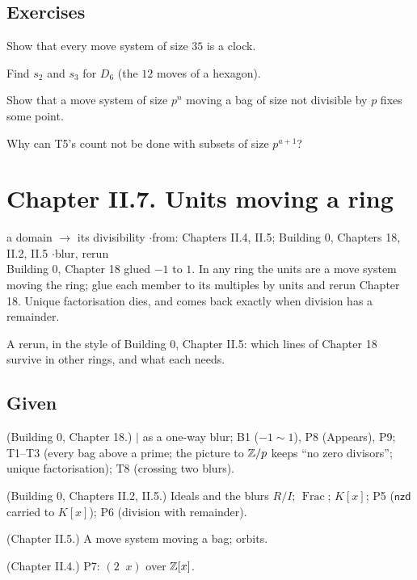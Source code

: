 \subsection*{Exercises}

\begin{lines}
\item[\lab{E1}] Show that every move system of size $35$ is a clock.
\item[\lab{E2}] Find $s_2$ and $s_3$ for $D_6$ (the $12$ moves of a hexagon).
\item[\lab{E3}] Show that a move system of size $p^n$ moving a bag of size not divisible by $p$ fixes some point.
\item[\lab{E4}] Why can T5's count not be done with subsets of size $p^{a+1}$?
\end{lines}

\newpage

\section*{Chapter II.7. Units moving a ring}
\begin{center}
{\normalsize a domain $\to$ its divisibility \quad$\cdot$\quad from: Chapters II.4, II.5; Building 0, Chapters 18, II.2, II.5 \quad$\cdot$\quad blur, rerun}\\[4pt]
{\small Building 0, Chapter 18 glued $-1$ to $1$. In any ring the units are a move system moving the ring; glue each member to its multiples by units and rerun Chapter 18. Unique factorisation dies, and comes back exactly when division has a remainder.}
\end{center}

A rerun, in the style of Building 0, Chapter II.5: which lines of Chapter 18 survive in other rings, and what each needs.

\subsection*{Given}

\begin{lines}
\item[\lab{G1}] (Building 0, Chapter 18.) $\mid$ as a one-way blur; B1 ($-1 \sim 1$), P8 (Appears), P9; T1--T3 (every bag above a prime; the picture to $\mathbb{Z}/p$ keeps ``no zero divisors''; unique factorisation); T8 (crossing two blurs).
\item[\lab{G2}] (Building 0, Chapters II.2, II.5.) Ideals and the blurs $R/I$; $\operatorname{Frac}$; $K[x]$; P5 ($\mathsf{nzd}$ carried to $K[x]$); P6 (division with remainder).
\item[\lab{G3}] (Chapter II.5.) A move system moving a bag; orbits.
\item[\lab{G4}] (Chapter II.4.) P7: $(2 \;\; x)$ over $\mathbb{Z}[x]$.
\end{lines}

